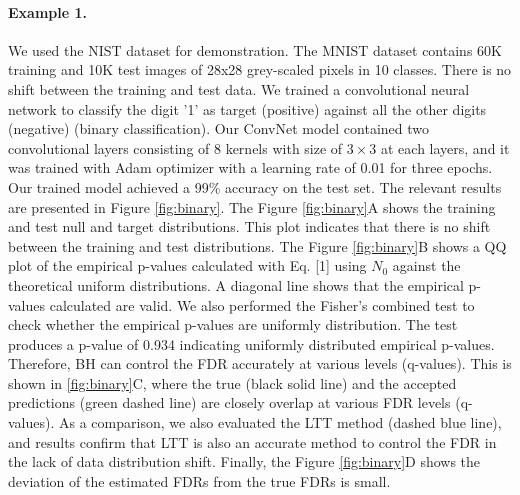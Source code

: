 \documentclass{article}
\begin{document}
\paragraph{Example 	 1.} \label{ex:vanilla} We used the NIST dataset for demonstration. The MNIST dataset contains 60K training and 10K test images of 28x28 grey-scaled pixels in 10 classes. There is no shift between the training and test data. We trained a convolutional neural network to classify the digit '1' as target (positive) against all the other digits (negative) (binary classification). Our ConvNet model contained two convolutional layers consisting of 8 kernels with size of $3\times3$ at each layers, and it was trained with Adam optimizer with a learning rate of 0.01 for three epochs. Our trained model achieved a 99\% accuracy on the test set. The relevant results are presented in Figure \ref{fig:binary}. The Figure \ref{fig:binary}A shows the training and test null and target distributions. This plot indicates that there is no shift between the training and test distributions. The Figure \ref{fig:binary}B shows a QQ plot of the empirical p-values calculated with Eq. [1] using $N_0$ against the theoretical uniform distributions. A diagonal line shows that the empirical p-values calculated are valid. We also performed the Fisher's combined test to check whether the empirical p-values are uniformly distribution. The test produces a p-value of 0.934 indicating uniformly distributed empirical p-values. Therefore, BH can control the FDR accurately at various levels (q-values). This is shown in \ref{fig:binary}C, where the true (black solid line) and the accepted predictions (green dashed line) are closely overlap at various FDR levels (q-values). As a comparison, we also evaluated the LTT method \cite{angelopoulos2021learn} (dashed blue line), and results confirm that LTT is also an accurate method to control the FDR in the lack of data distribution shift. Finally, the Figure \ref{fig:binary}D shows the deviation of the estimated FDRs from the true FDRs is small.
\end{document}
